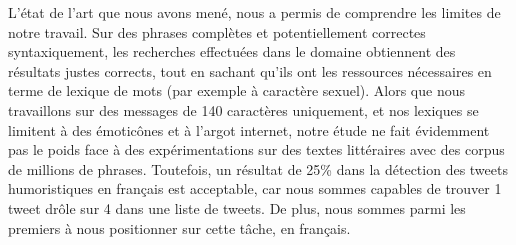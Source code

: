 \documentclass[10pt,a4paper,twoside]{article}
\begin{document}
L'état de l'art que nous avons mené, nous a permis de comprendre les limites de notre travail. Sur des phrases complètes et potentiellement correctes syntaxiquement, les recherches effectuées dans le domaine obtiennent des résultats justes corrects, tout en sachant qu'ils ont les ressources nécessaires en terme de lexique de mots (par exemple à caractère sexuel). Alors que nous travaillons sur des messages de 140 caractères uniquement, et nos lexiques se limitent à des émoticônes et à l'argot internet, notre étude ne fait évidemment pas le poids face à des expérimentations sur des textes littéraires avec des corpus de millions de phrases. Toutefois, un résultat de 25\% dans la détection des tweets humoristiques en français est acceptable, car nous sommes capables de trouver 1 tweet drôle sur 4 dans une liste de tweets. De plus, nous sommes parmi les premiers à nous positionner sur cette tâche, en français.




\nocite{Kiddon11,MihalceaP07}

\end{document}
